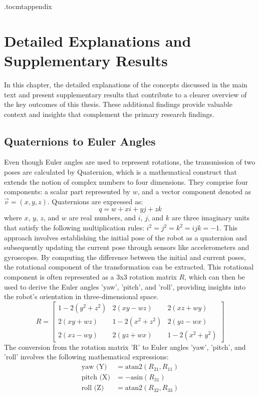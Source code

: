 \newpage
\appendix
\newpage

\captionsetup[figure]{font=small,skip=0pt}
\etocdepthtag.toc{mtappendix}
\tableofcontents
\pagestyle{plain}
\newpage
{}

\chapter{Detailed Explanations and Supplementary Results}
In this chapter, the detailed explanations of the concepts discussed in the main text and present supplementary results that contribute to a clearer overview of the key outcomes of this thesis. These additional findings provide valuable context and insights that complement the primary research findings.

\section{Quaternions to Euler Angles}
\label{sec:Q2E}
Even though Euler angles are used to represent rotations, the transmission of two poses are calculated by Quaternion, which is a mathematical construct that extends the notion of complex numbers to four dimensions. They comprise four components: a scalar part represented by $w$, and a vector component denoted as $\vec{v}=(x, y, z)$. Quaternions are expressed as:
$$q = w + xi + yj + zk$$
where $x$, $y$, $z$, and $w$ are real numbers, and $i$, $j$, and $k$ are three imaginary units that satisfy the following multiplication rules: $i^2 = j^2 = k^2 = ijk = -1$. This approach involves establishing the initial pose of the robot as a quaternion and subsequently updating the current pose through sensors like accelerometers and gyroscopes. By computing the difference between the initial and current poses, the rotational component of the transformation can be extracted. This rotational component is often represented as a 3x3 rotation matrix $R$, which can then be used to derive the Euler angles 'yaw', 'pitch', and 'roll', providing insights into the robot's orientation in three-dimensional space. 
$$ R = \begin{bmatrix}
1 - 2(y^2 + z^2) & 2(xy - wz) & 2(xz + wy) \\
2(xy + wz) & 1 - 2(x^2 + z^2) & 2(yz - wx) \\
2(xz - wy) & 2(yz + wx) & 1 - 2(x^2 + y^2)
\end{bmatrix}
$$
The conversion from the rotation matrix 'R' to Euler angles 'yaw', 'pitch', and 'roll' involves the following mathematical expressions:
\begin{align*}
\text{yaw (Y)} & = \text{atan2}(R_{21}, R_{11}) \\
\text{pitch (X)} & = -\text{asin}(R_{31}) \\
\text{roll (Z)} & = \text{atan2}(R_{32}, R_{33})
\end{align*}

